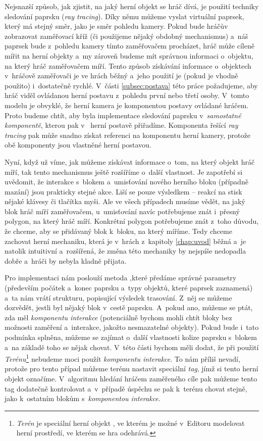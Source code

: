 Nejsnazší způsob, jak zjistit, na jaký herní objekt se hráč dívá, je použití techniky sledování paprsku (\textit{ray tracing}). Díky němu můžeme  vyslat virtuální paprsek, který má stejný směr, jako je směr pohledu kamery. Pokud bude hráčův \HUD{} zobrazovat zaměřovací kříž (či použijeme nějaký obdobný mechanismus) a~náš paprsek bude z~pohledu kamery tímto zaměřovačem procházet, hráč může cíleně mířit na herní objekty a~my zároveň budeme mít správnou informaci o~objektu, na který hráč zaměřovačem míří. Tento způsob získávání informace o~objektech v~hráčově zaměřovači je ve hrách běžný a~jeho použití je (pokud je vhodně použito) i~dostatečně rychlé. V~části \ref{subsec:postava} této práce požadujeme, aby hráč viděl ovládanou herní postavu z~pohledu první nebo třetí osoby. V~tomto modelu je obvyklé, že herní kamera je komponentou postavy ovládané hráčem. Proto budeme chtít, aby byla implementace sledování paprsku v~\textit{samostatné komponentě}, kterou pak v~\UEu{} herní postavě přiřadíme. Komponenta řešící \textit{ray tracing} pak může snadno získat referenci na komponentu herní kamery, protože obě komponenty jsou vlastněné herní postavou.

Nyní, když už víme, jak můžeme získávat informace o~tom, na který objekt hráč míří, tak tento mechanismus ještě rozšíříme o~další vlastnost. Je zapotřebí si uvědomit, že interakce s~blokem a~umisťování nového herního bloku (případně mazání) jsou prakticky stejné akce. Liší se pouze výsledkem -- reakcí na stisk nějaké klávesy či tlačítka myši. Ale ve všech případech musíme vědět, na jaký blok hráč míří zaměřovačem, u~umisťování navíc potřebujeme znát i~přesný polygon, na který hráč míří. Konkrétní polygon potřebujeme znát z~toho důvodu, že chceme, aby se přidávaný blok  k~bloku, na který míříme. Tedy chceme zachovat herní mechaniku, která je v~hrách z~kapitoly \ref{chap:uvod} běžná a~je natolik intuitivní a~rozšířená, že změna této mechaniky by nejspíše nedopadla dobře a~hráči by nebyla kladně přijata.

Pro implementaci nám poslouží metoda ,\linebreak které předáme správné parametry (především počátek a~konec paprsku a~typy objektů, které paprsek zaznamená) a~ta nám vrátí strukturu, popisující výsledek trasování. Z~něj se můžeme dozvědět, jestli byl nějaký blok v~cestě paprsku. A~pokud ano, můžeme se ptát, zda měl \textit{komponentu interakce} (potenciálně bychom mohli chtít bloky bez možnosti zaměření a~interakce, jakožto nesmazatelné objekty). Pokud bude i~tato podmínka splněna, můžeme se zajímat o~další vlastnosti kolize paprsku s~blokem a~na základě toho se nějak chovat. V~této části bychom měli dodat, že při použití \textit{Terénu}\footnote{\textit{Terén} je speciální herní objekt \UEu{}, ve kterém je možné v~Editoru modelovat herní prostředí, ve kterém se hra odehrává.} nebudeme moci použít \textit{komponentu interakce}. To nám příliš nevadí, protože pro tento případ můžeme terénu nastavit speciální \textit{tag}, jímž si tento herní objekt označíme. V~algoritmu hledání hráčem zaměřeného cíle pak můžeme tento tag dodatečně kontrolovat a~v~případě úspěchu se pak k~terénu chovat stejně, jako k~ostatním blokům s~\textit{komponentou interakce}.

